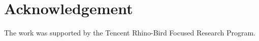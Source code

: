 \documentclass{article}
\begin{document}
\section*{Acknowledgement}
The work was supported by the Tencent Rhino-Bird
Focused Research Program.





\newpage




\end{document}

